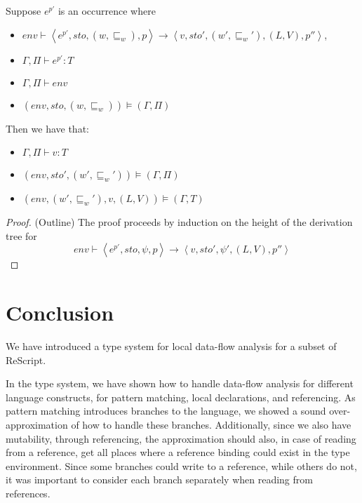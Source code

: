 \documentclass[acmsmall,sigplan]{acmart}
\begin{document}
\begin{theorem}
	Suppose $e^{p'}$ is an occurrence where
	\begin{itemize}
		\item $env\vdash\left\langle e^{p'},sto,(w,\sqsubseteq_w),p\right\rangle\rightarrow\left\langle v,sto',(w',\sqsubseteq_w'),(L,V),p''\right\rangle$,
		\item $\Gamma,\Pi\vdash e^{p'} : T$
		\item $\Gamma,\Pi\vdash env$
		\item $(env,sto,(w,\sqsubseteq_w))\models(\Gamma,\Pi)$
	\end{itemize}
	Then we have that:
	\begin{itemize}
		\item $\Gamma,\Pi\vdash v:T$
		\item $(env,sto',(w',\sqsubseteq_w'))\models(\Gamma,\Pi)$
		\item $(env,(w',\sqsubseteq_w'),v,(L,V))\models(\Gamma,T)$
	\end{itemize}
\end{theorem}
\begin{proof}(Outline)
	The proof proceeds by induction on the height of the derivation tree for 
	$$env\vdash\left\langle e^{p'},sto,\psi,p\right\rangle\rightarrow\left\langle v,sto',\psi',(L,V),p''\right\rangle$$

\end{proof}

% 

\section{Conclusion}\label{sec:Conc}

We have introduced a type system for local data-flow analysis for a
subset of ReScript. 

In the type system, we have shown how to handle data-flow analysis for
different language constructs, for pattern matching, local
declarations, and referencing. 
As pattern matching introduces branches to the language, we showed a
sound over-approximation of how to handle these branches. 
Additionally, since we also have mutability, through referencing, the approximation should also, in case of reading from a reference, get all places where a reference binding could exist in the type environment.
Since some branches could write to a reference, while others do not, it was important to consider each branch separately when reading from references.
\end{document}
